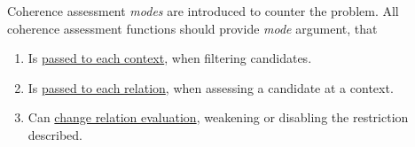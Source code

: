 \documentclass[ThesisDoc]{subfiles}
\begin{document}
Coherence assessment \emph{modes} are introduced to counter the problem.
All coherence assessment functions should provide \emph{mode} argument, that
\begin{enumerate}
  \item Is \underline{passed to each context}, when filtering candidates.
  \item Is \underline{passed to each relation}, when assessing a candidate at a context.
  \item Can \underline{change relation evaluation}, weakening or disabling the
        restriction described.
\end{enumerate}





\end{document}
